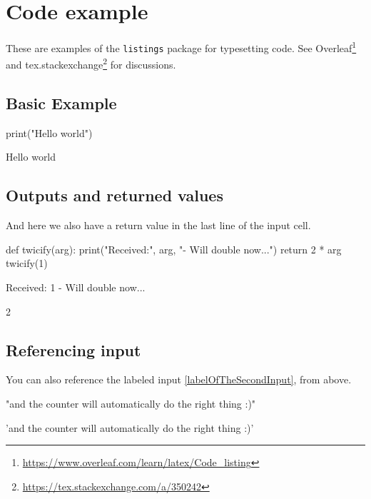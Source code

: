 
\section{Code example}

These are examples of the \texttt{listings} package for typesetting code. See Overleaf\footnote{\url{https://www.overleaf.com/learn/latex/Code_listing}} and tex.stackexchange\footnote{\url{https://tex.stackexchange.com/a/350242}} for discussions.

\subsection{Basic Example}
\begin{pyin}
print("Hello world")
\end{pyin}

\begin{pyprint}
Hello world
\end{pyprint}

\subsection{Outputs and returned values}
And here we also have a return value in the last line of the input cell.
\begin{pyin}[labelOfTheSecondInput]
def twicify(arg):
    print("Received:", arg, "- Will double now...")
    return 2 * arg
twicify(1)
\end{pyin}

\begin{pyprint}
Received: 1 - Will double now...
\end{pyprint}

\begin{pyout}
2
\end{pyout}

\subsection{Referencing input}
You can also reference the labeled input \ref{labelOfTheSecondInput}, from above.
\begin{pyin}
"and the counter will automatically do the right thing :)"
\end{pyin}
\begin{pyout}
'and the counter will automatically do the right thing :)'
\end{pyout}
